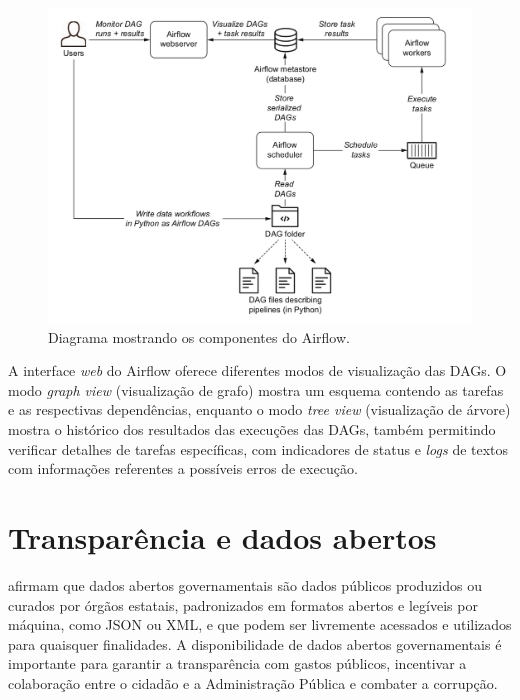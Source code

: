 \begin{figure}[htb]
	\caption{\label{fig:Fig_2}Diagrama mostrando os componentes do Airflow.}
	\begin{center}
		\includegraphics[scale=0.6]{images/airflow-components.png}
	\end{center}
\end{figure}

A interface \textit{web} do Airflow oferece diferentes modos de visualização das DAGs. O modo \textit{graph view} (visualização de grafo) mostra um esquema contendo as tarefas e as respectivas dependências, enquanto o modo \textit{tree view} (visualização de árvore) mostra o histórico dos resultados das execuções das DAGs, também permitindo verificar detalhes de tarefas específicas, com indicadores de status e \textit{logs} de textos com informações referentes a possíveis erros de execução.

\section{Transparência e dados abertos}

\cite{possamai2020transparencia} afirmam que dados abertos governamentais são dados públicos produzidos ou curados por órgãos estatais, padronizados em formatos abertos e legíveis por máquina, como JSON ou XML, e que podem ser livremente acessados e utilizados para quaisquer finalidades. A disponibilidade de dados abertos governamentais é importante para garantir a transparência com gastos públicos, incentivar a colaboração entre o cidadão e a Administração Pública e combater a corrupção.

